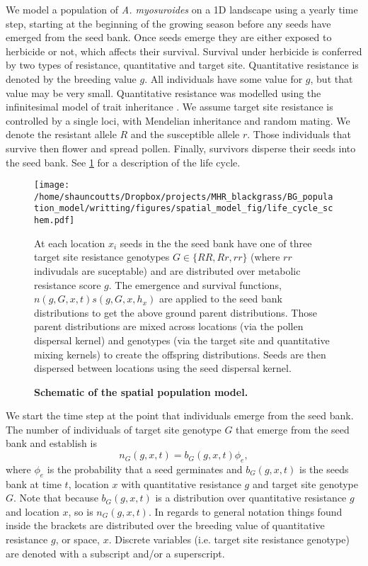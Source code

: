 \documentclass[10pt,letterpaper]{article}
\begin{document}
We model a population of \textit{A. myosuroides} on a 1D landscape using a yearly time step, starting at the beginning of the growing season before any seeds have emerged from the seed bank. Once seeds emerge they are either exposed to herbicide or not, which affects their survival. Survival under herbicide is conferred by two types of resistance, quantitative and target site. Quantitative resistance is denoted by the breeding value $g$. All individuals have some value for $g$, but that value may be very small. Quantitative resistance was modelled using the infinitesimal model of trait inheritance \cite{Fish1918}. We assume target site resistance is controlled by a single loci, with Mendelian inheritance and random mating. We denote the resistant allele $R$ and the susceptible allele $r$. Those individuals that survive then flower and spread pollen. Finally, survivors disperse their seeds into the seed bank. See \ref{fig:schematic} for a description of the life cycle.  

\begin{figure}[!h] 
	\texttt{[image: /home/shauncoutts/Dropbox/projects/MHR\_blackgrass/BG\_population\_model/writting/figures/spatial\_model\_fig/life\_cycle\_schem.pdf]}
\caption{\bf Schematic of the spatial population model.} At each location $x_i$ seeds in the the seed bank have one of three target site resistance genotypes $G \in \{RR, Rr, rr\}$ (where $rr$ indivudals are suceptable) and are distributed over metabolic resistance score $g$. The emergence and survival functions, $n(g, G, x, t)s(g, G, x, h_x)$ are applied to the seed bank distributions to get the above ground parent distributions. Those parent distributions are mixed across locations (via the pollen dispersal kernel) and genotypes (via the target site and quantitative mixing kernels) to create the offspring distributions. Seeds are then dispersed between locations using the seed dispersal kernel. \label{fig:schematic}
\end{figure}

We start the time step at the point that individuals emerge from the seed bank. The number of individuals of target site genotype $G$ that emerge from the seed bank and establish is 
\begin{equation}\label{eq:above_ground}
	n_G(g, x, t) = b_G(g, x, t)\phi_e,
\end{equation}
where $\phi_e$ is the probability that a seed germinates and $b_G(g, x, t)$ is the seeds bank at time $t$, location $x$ with quantitative resistance $g$ and target site genotype $G$. Note that because $b_G(g, x, t)$ is a distribution over quantitative resistance $g$ and location $x$, so is $n_G(g, x, t)$. In regards to general notation things found inside the brackets are distributed over the breeding value of quantitative resistance $g$, or space, $x$. Discrete variables (i.e. target site resistance genotype) are denoted with a subscript and/or a superscript.       
\end{document}

